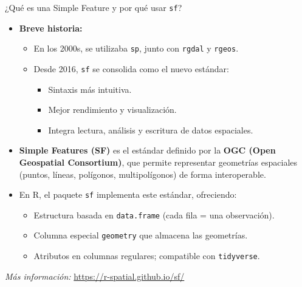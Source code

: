 \documentclass{beamer}
\begin{document}
\begin{frame}{¿Qué es una Simple Feature y por qué usar \texttt{sf}?}
\small
\begin{itemize}
  \item \textbf{Breve historia:}
  \begin{itemize}
    \item En los 2000s, se utilizaba \texttt{sp}, junto con \texttt{rgdal} y \texttt{rgeos}.
    \item Desde 2016, \texttt{sf} se consolida como el nuevo estándar:
  \begin{itemize}
    \item Sintaxis más intuitiva.
    \item Mejor rendimiento y visualización.
    \item Integra lectura, análisis y escritura de datos espaciales.
  \end{itemize}
  \end{itemize}
    \item \textbf{Simple Features (SF)} es el estándar definido por la \textbf{OGC (Open Geospatial Consortium)}, que permite representar geometrías espaciales (puntos, líneas, polígonos, multipolígonos) de forma interoperable.
    \item En R, el paquete \texttt{sf} implementa este estándar, ofreciendo:
  \begin{itemize}
    \item Estructura basada en \texttt{data.frame} (cada fila = una observación).
    \item Columna especial \texttt{geometry} que almacena las geometrías.
    \item Atributos en columnas regulares; compatible con \texttt{tidyverse}.
  \end{itemize}
\end{itemize}
\textit{Más información:} \href{https://r-spatial.github.io/sf/}{https://r-spatial.github.io/sf/}
\end{frame}
\end{document}
